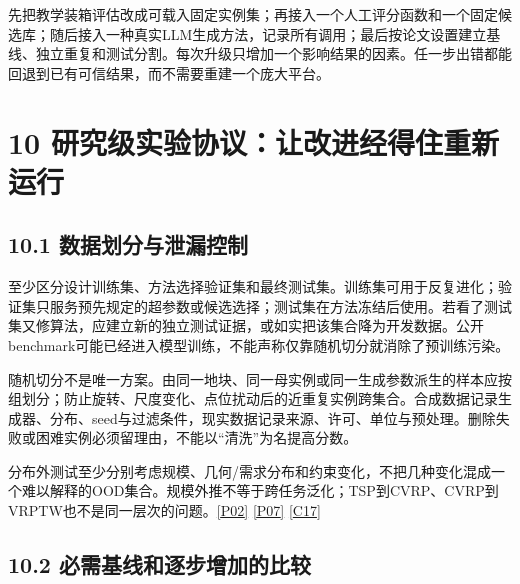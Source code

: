 先把教学装箱评估改成可载入固定实例集；再接入一个人工评分函数和一个固定候选库；随后接入一种真实LLM生成方法，记录所有调用；最后按论文设置建立基线、独立重复和测试分割。每次升级只增加一个影响结果的因素。任一步出错都能回退到已有可信结果，而不需要重建一个庞大平台。

\section{10
研究级实验协议：让改进经得住重新运行}\label{ux7814ux7a76ux7ea7ux5b9eux9a8cux534fux8baeux8ba9ux6539ux8fdbux7ecfux5f97ux4f4fux91cdux65b0ux8fd0ux884c}

\subsection{10.1
数据划分与泄漏控制}\label{ux6570ux636eux5212ux5206ux4e0eux6cc4ux6f0fux63a7ux5236}

至少区分设计训练集、方法选择验证集和最终测试集。训练集可用于反复进化；验证集只服务预先规定的超参数或候选选择；测试集在方法冻结后使用。若看了测试集又修算法，应建立新的独立测试证据，或如实把该集合降为开发数据。公开benchmark可能已经进入模型训练，不能声称仅靠随机切分就消除了预训练污染。

随机切分不是唯一方案。由同一地块、同一母实例或同一生成参数派生的样本应按组划分；防止旋转、尺度变化、点位扰动后的近重复实例跨集合。合成数据记录生成器、分布、seed与过滤条件，现实数据记录来源、许可、单位与预处理。删除失败或困难实例必须留理由，不能以``清洗''为名提高分数。

分布外测试至少分别考虑规模、几何/需求分布和约束变化，不把几种变化混成一个难以解释的OOD集合。规模外推不等于跨任务泛化；TSP到CVRP、CVRP到VRPTW也不是同一层次的问题。\href{https://arxiv.org/abs/2401.02051}{{[}P02{]}}
\href{https://ojs.aaai.org/index.php/AAAI/article/view/41038}{{[}P07{]}}
\href{https://github.com/ai4co/rl4co}{{[}C17{]}}

\subsection{10.2
必需基线和逐步增加的比较}\label{ux5fc5ux9700ux57faux7ebfux548cux9010ux6b65ux589eux52a0ux7684ux6bd4ux8f83}

